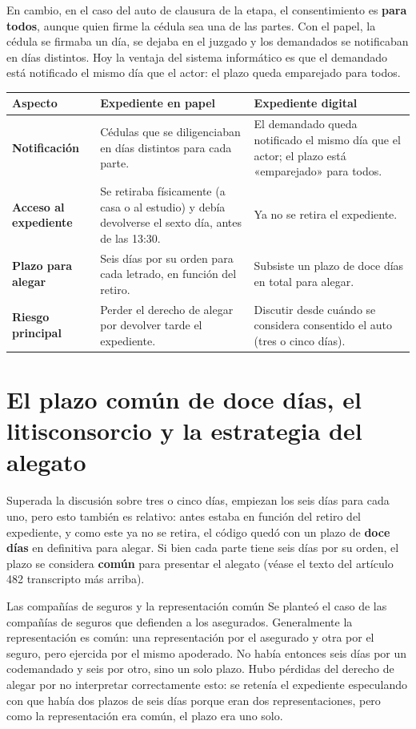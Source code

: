 \documentclass[12pt,oneside]{book}
\begin{document}
En cambio, en el caso del auto de clausura de la etapa, el consentimiento es \textbf{para todos}, aunque quien firme la cédula sea una de las partes. Con el papel, la cédula se firmaba un día, se dejaba en el juzgado y los demandados se notificaban en días distintos. Hoy la ventaja del sistema informático es que el demandado está notificado el mismo día que el actor: el plazo queda emparejado para todos.

\begin{table}[H]
\centering
\small
\begin{tabularx}{\textwidth}{L{0.20\textwidth} Y Y}
\toprule
\textbf{Aspecto} & \textbf{Expediente en papel} & \textbf{Expediente digital} \\
\midrule
\textbf{Notificación} & Cédulas que se diligenciaban en días distintos para cada parte. & El demandado queda notificado el mismo día que el actor; el plazo está «emparejado» para todos. \\
\textbf{Acceso al expediente} & Se retiraba físicamente (a casa o al estudio) y debía devolverse el sexto día, antes de las 13:30. & Ya no se retira el expediente. \\
\textbf{Plazo para alegar} & Seis días por su orden para cada letrado, en función del retiro. & Subsiste un plazo de doce días en total para alegar. \\
\textbf{Riesgo principal} & Perder el derecho de alegar por devolver tarde el expediente. & Discutir desde cuándo se considera consentido el auto (tres o cinco días). \\
\bottomrule
\end{tabularx}
\end{table}

\section{El plazo común de doce días, el litisconsorcio y la estrategia del alegato}

Superada la discusión sobre tres o cinco días, empiezan los seis días para cada uno, pero esto también es relativo: antes estaba en función del retiro del expediente, y como este ya no se retira, el código quedó con un plazo de \textbf{doce días} en definitiva para alegar. Si bien cada parte tiene seis días por su orden, el plazo se considera \textbf{común} para presentar el alegato (véase el texto del artículo 482 transcripto más arriba).

\begin{example}{Las compañías de seguros y la representación común}
Se planteó el caso de las compañías de seguros que defienden a los asegurados. Generalmente la representación es común: una representación por el asegurado y otra por el seguro, pero ejercida por el mismo apoderado. No había entonces seis días por un codemandado y seis por otro, sino un solo plazo. Hubo pérdidas del derecho de alegar por no interpretar correctamente esto: se retenía el expediente especulando con que había dos plazos de seis días porque eran dos representaciones, pero como la representación era común, el plazo era uno solo.
\end{example}
\end{document}
